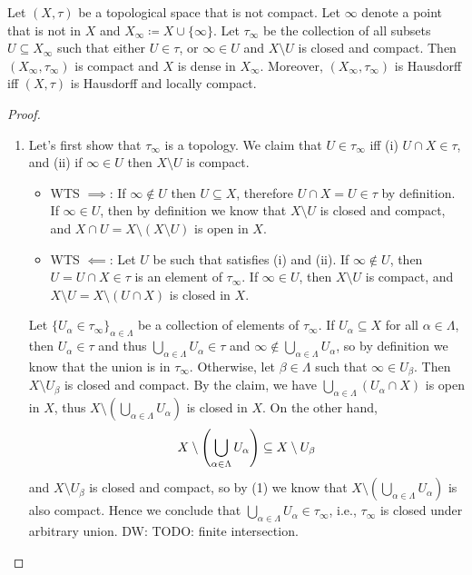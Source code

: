 \documentclass{techreport}
\newcommand{\diw}[1]{{\color{Red} DW: #1}}
\begin{document}
\begin{theorem}\label{The:AlexandroffCompactification}
	Let $(X,\tau)$ be a topological space that is not compact.
	Let $\infty$ denote a point that is not in $X$ and $X_\infty \coloneqq X \cup \{\infty\}$.
	Let $\tau_\infty$ be the collection of all subsets $U \subseteq X_\infty$ such that either $U \in \tau$, or $\infty \in U$ and $X \setminus U$ is closed and compact.
	Then $(X_\infty,\tau_\infty)$ is compact and $X$ is dense in $X_\infty$.
	Moreover, $(X_\infty,\tau_\infty)$ is Hausdorff iff $(X,\tau)$ is Hausdorff and locally compact.
\end{theorem}
\begin{proof}
	\begin{enumerate}
		\item Let's first show that $\tau_\infty$ is a topology.
		We claim that $U \in \tau_\infty$ iff (i) $U \cap X \in \tau$, and (ii) if $\infty \in U$ then $X \setminus U$ is compact.
		\begin{itemize}
			\item WTS ${\implies}$: If $\infty \not\in U$ then $U \subseteq X$, therefore $U \cap X = U \in \tau$ by definition.
			If $\infty \in U$, then by definition we know that $X \setminus U$ is closed and compact, and $X \cap U = X \setminus (X \setminus U)$ is open in $X$.
			\item WTS $\impliedby$: Let $U$ be such that satisfies (i) and (ii).
			If $\infty \not\in U$, then $U = U \cap X \in \tau$ is an element of $\tau_\infty$.
			If $\infty \in U$, then $X \setminus U$ is compact, and $X \setminus U = X \setminus (U \cap X)$ is closed in $X$.
		\end{itemize}
		Let $\{ U_\alpha \in \tau_\infty\}_{\alpha \in \Lambda}$ be a collection of elements of $\tau_\infty$.
		If $U_\alpha \subseteq X$ for all $\alpha \in \Lambda$, then $U_\alpha \in \tau$ and thus $\bigcup_{\alpha \in \Lambda} U_\alpha \in \tau$ and $\infty \not\in \bigcup_{\alpha \in \Lambda} U_\alpha$, so by definition we know that the union is in $\tau_\infty$.
		Otherwise, let $\beta \in \Lambda$ such that $\infty \in U_\beta$.
		Then $X \setminus U_\beta$ is closed and compact.
		By the claim, we have $\bigcup_{\alpha \in \Lambda} (U_\alpha \cap X)$ is open in $X$, thus $X \setminus (\bigcup_{\alpha \in \Lambda} U_\alpha)$ is closed in $X$.
		On the other hand,
		\[
		X \setminus \left({\bigcup_{\alpha \in \Lambda} U_\alpha}\right) \subseteq X \setminus U_\beta
		\]
		and $X \setminus U_\beta$ is closed and compact, so by (1) we know that $X \setminus (\bigcup_{\alpha \in \Lambda} U_\alpha)$ is also compact.
		Hence we conclude that $\bigcup_{\alpha \in \Lambda} U_\alpha \in \tau_\infty$, i.e., $\tau_\infty$ is closed under arbitrary union.
		\diw{TODO: finite intersection.}
		

\end{enumerate}
\end{proof}
\end{document}
